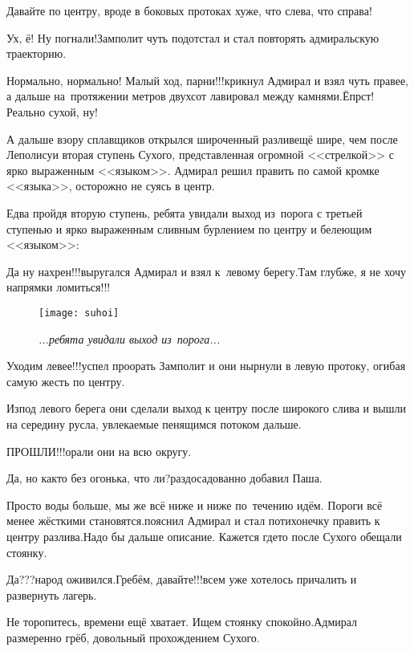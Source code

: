 \diagdash Давайте по центру, вроде в боковых протоках хуже, что слева, что справа!

\diagdash Ух, ё! Ну погнали!\mdash Замполит чуть подотстал и стал повторять адмиральскую траекторию.

\diagdash Нормально, нормально! Малый ход, парни!!!\mdash крикнул Адмирал и взял чуть правее, а дальше на~протяжении метров двухсот лавировал между камнями.\mdash Ёпрст! Реально сухой, ну!

А дальше взору сплавщиков открылся широченный разлив\mdash ещё шире, чем после Леполису\mdash и вторая ступень Сухого, представленная огромной <<стрелкой>> с ярко выраженным <<языком>>. Адмирал решил править по самой кромке <<языка>>, осторожно не суясь в центр.

Едва пройдя вторую ступень, ребята увидали выход из~порога с третьей ступенью и ярко выраженным сливным бурлением по центру и белеющим <<языком>>:

\diagdash Да ну нахрен!!!\mdash выругался Адмирал и взял к~левому берегу.\mdash Там глубже, я не хочу напрямки ломиться!!!

	\begin{figure}[h]
	\centering
	\texttt{[image: suhoi]}
	\caption{\small\textit{...ребята увидали выход из~порога...}}
	\end{figure}

\diagdash Уходим левее!!!\mdash успел проорать Замполит и они нырнули в левую протоку, огибая самую жесть по центру.

Из\sdash под левого берега они сделали выход к центру после широкого слива и вышли на середину русла, увлекаемые пенящимся потоком дальше.

\diagdash ПРОШЛИ!!!\mdash орали они на всю округу.

\diagdash Да, но как\sdash то без огонька, что ли?\mdash раздосадованно добавил Паша.

\diagdash Просто воды больше, мы же всё ниже и ниже по~течению идём. Пороги всё менее жёсткими становятся.\mdash пояснил Адмирал и стал потихонечку править к центру разлива.\mdash Надо бы дальше описание. Кажется где\sdash то после Сухого обещали стоянку.

\diagdash Да???\mdash народ оживился.\mdash Гребём, давайте!!!\mdash всем уже хотелось причалить и развернуть лагерь.

\diagdash Не торопитесь, времени ещё хватает. Ищем стоянку спокойно.\mdash Адмирал размеренно грёб, довольный прохождением Сухого.

